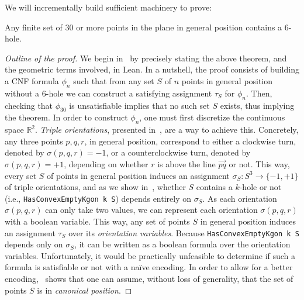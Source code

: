 We will incrementally build sufficient machinery to prove:

\begin{theorem*}
Any finite set of $30$ or more points in the plane in general position contains a $6$-hole.
\end{theorem*}

\begin{proof}[Outline of the proof]
We begin in~ by precisely stating the above theorem, and the geometric terms involved, in Lean. In a nutshell, the proof consists of building a CNF formula $\phi_n$ such that 
from any set $S$ of $n$ points in general position without a $6$-hole we can construct a satisfying assignment $\tau_S$ for $\phi_n$.
Then, checking that $\phi_{30}$ is unsatisfiable implies that no such set $S$ exists, thus implying the theorem. 
% 
In order to construct $\phi_n$, one must first discretize the continuous space $\mathbb{R}^2$. \emph{Triple orientations}, presented in~, are a way to achieve this. Concretely, any three points $p,q,r$, in general position, correspond to either a clockwise turn, denoted by $\sigma(p, q, r) = -1$, or a counterclockwise turn, denoted by $\sigma(p, q, r) = +1$, depending on whether $r$ is above the line $\vec{pq}$ or not. 
This way, every set $S$ of points in general position induces an assignment $\sigma_S: S^3 \to \{-1,+1\}$
of triple orientations, and as we show in~, whether $S$ contains a $k$-hole or not (i.e., \lstinline|HasConvexEmptyKgon k S|) depends entirely on $\sigma_S$. 
As each orientation $\sigma(p, q, r)$ can only take two values, we can represent each orientation $\sigma(p,q,r)$ with a boolean variable. This way, any set of points $S$ in general position induces an assignment $\tau_S$ over its \emph{orientation variables}. 
Because \lstinline|HasConvexEmptyKgon k S| depends only on $\sigma_S$, it can be written as a boolean formula over the orientation variables.
% 
Unfortunately, it would be practically unfeasible to determine if such a formula is satisfiable or not with a naïve encoding.
In order to allow for a better encoding,~ shows that one can assume, without loss of generality, that the set of points $S$ is in \emph{canonical position}.

\end{proof}
